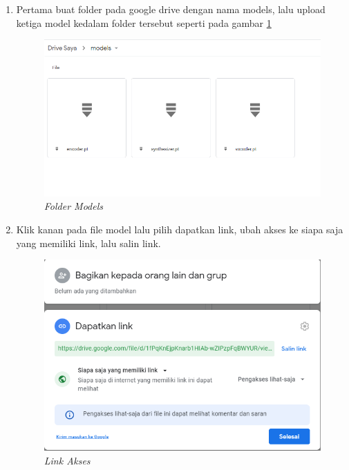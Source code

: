 \begin{enumerate}

\item Pertama buat folder pada google drive dengan nama models, lalu upload ketiga model kedalam folder tersebut seperti pada gambar \ref{tutor2}
\begin{figure}[H]
    \centering
    \includegraphics[scale=0.35]{figures/tutor2}
    \caption{\textit{Folder Models}}
    \label{tutor2}
\end{figure}

\item Klik kanan pada file model lalu pilih dapatkan link, ubah akses ke siapa saja yang memiliki link, lalu salin link.

\begin{figure}[H]
    \centering
    \includegraphics[scale=0.35]{figures/tutor3}
    \caption{\textit{Link Akses}}
    \label{tutor3}
\end{figure}


\end{enumerate}
